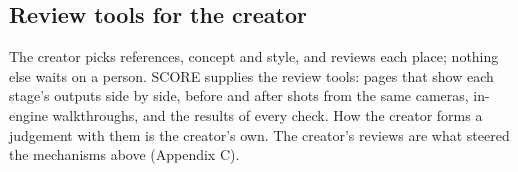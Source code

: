 \subsection{Review tools for the creator}\label{review-tools-for-the-creator}

The creator picks references, concept and style, and reviews each place; nothing else waits on a person. SCORE supplies the review tools: pages that show each stage's outputs side by side, before and after shots from the same cameras, in-engine walkthroughs, and the results of every check. How the creator forms a judgement with them is the creator's own. The creator's reviews are what steered the mechanisms above (Appendix C).

\begin{center}\end{center}
